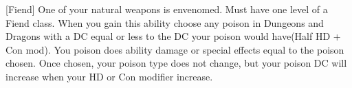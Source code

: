  {[Fiend]}
\shortdescfeat
{One of your natural weapons is envenomed.}
{Must have one level of a Fiend class.}
{When you gain this ability choose any poison in Dungeons and Dragons with a DC equal or less to the DC your poison would have(Half HD + Con mod). You poison does ability damage or special effects equal to the poison chosen. Once chosen, your poison type does not change, but your poison DC will increase when your HD or Con modifier increase.}